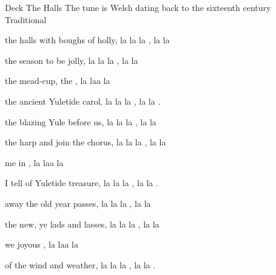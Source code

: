 \begin{SBSong}{Deck The Halls}
    {The tune is Welsh dating back to the sixteenth century}
    {Traditional}
  \begin{SBVerse}
     the halls with boughs of holly, \WBLineBrk 
	 la la la , la  la 
	
	 the season to be jolly, \WBLineBrk
	 la la la , la  la 
	
	 the mead-cup,  the , \WBLineBrk 
	 la laa   la 
	
	 the ancient Yuletide carol, \WBLineBrk	
	 la la la , la  la .
  \end{SBVerse}
  
  \begin{SBVerse}
	 the blazing Yule before us, \WBLineBrk
	 la la la , la  la 
	
	 the harp and join the chorus, \WBLineBrk
	 la la la , la  la 
	
	 me in  , \WBLineBrk		
	 la laa   la 
	
	 I tell of Yuletide treasure, \WBLineBrk	
	 la la la , la  la .
  \end{SBVerse}
  \begin{SBVerse}
     away the old year passes, \WBLineBrk
     la la la , la  la 
	
     the new, ye lads and lasses, \WBLineBrk    
	 la la la , la  la 
	
     we joyous  ,\WBLineBrk		
	 la laa   la 
	
     of the wind and weather, \WBLineBrk
	 la la la , la  la .
  \end{SBVerse}
\end{SBSong}


